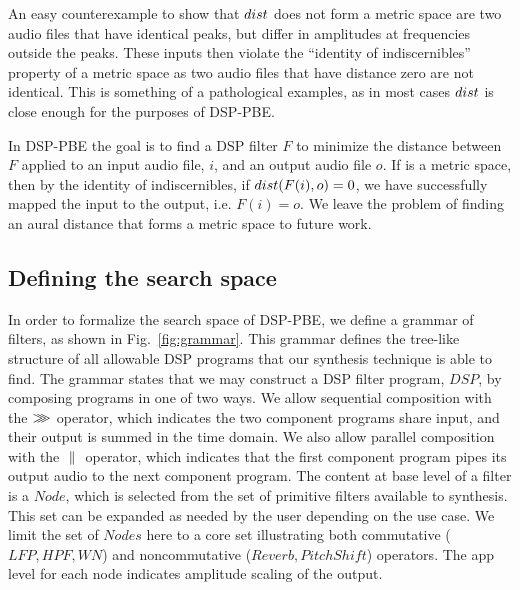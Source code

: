 An easy counterexample to show that ${dist}$ does not form a metric space are two audio files that have identical peaks, but differ in amplitudes at frequencies outside the peaks.
These inputs then violate the ``identity of indiscernibles'' property of a metric space as two audio files that have distance zero are not identical.
This is something of a pathological examples, as in most cases ${dist}$ is close enough for the purposes of DSP-PBE.

In DSP-PBE the goal is to find a DSP filter $F$ to minimize the distance between $F$ applied to an input audio file, $i$, and an output audio file $o$.
If \distFxn is a metric space, then by the identity of indiscernibles, if ${dist}(F(i),o) = 0$, we have successfully mapped the input to the output, i.e. $F(i) = o$.
We leave the problem of finding an aural distance that forms a metric space to future work.
 

\subsection{Defining the search space}

In order to formalize the search space of DSP-PBE, we define a grammar of filters, as shown in Fig.~\ref{fig:grammar}.
This grammar defines the tree-like structure of all allowable DSP programs that our synthesis technique is able to find.
The grammar states that we may construct a DSP filter program, $DSP$, by composing programs in one of two ways.
We allow sequential composition with the $>\mkern-9mu>\mkern-9mu>$ operator, which indicates the two component programs share input, and their output is summed in the time domain.
We also allow parallel composition with the $\ |\mkern-2mu|\ $ operator, which indicates that the first component program pipes its output audio to the next component program.
The content at base level of a filter is a $Node$, which is selected from the set of primitive filters available to synthesis.
This set can be expanded as needed by the user depending on the use case.
We limit the set of $Nodes$ here to a core set illustrating both commutative ($LFP, HPF, WN$) and noncommutative ($Reverb, PitchShift$) operators.
The app level for each node indicates amplitude scaling of the output.

